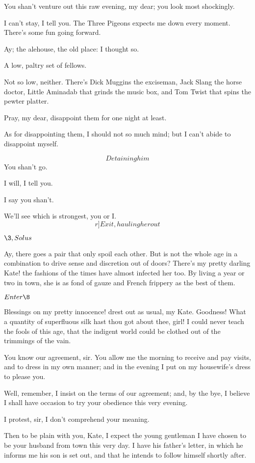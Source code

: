 \documentclass{book}
\begin{document}
\7  You shan't venture out this raw evening, my dear; you
look most shockingly.

\5  I can't stay, I tell you.  The Three Pigeons expects me down
every moment.  There's some fun going forward.

\3  Ay; the alehouse, the old place: I thought so.


\7  A low, paltry set of fellows.

\5  Not so low, neither.  There's Dick Muggins the exciseman, Jack
Slang the horse doctor, Little Aminadab that grinds the music box, and
Tom Twist that spins the pewter platter.

\7  Pray, my dear, disappoint them for one night at
least.

\5  As for disappointing them, I should not so much mind; but I
can't abide to disappoint myself.

\7  \[Detaining him\]  You shan't go.

\5  I will, I tell you.

\7  I say you shan't.

\5  We'll see which is strongest, you or I.  \[r]Exit, hauling her
out\]

\(\3, Solus\)

\3 Ay, there goes a pair that only spoil each
other.  But is not the whole age in a combination to drive sense and
discretion out of doors?  There's my pretty darling Kate! the fashions
of the times have almost infected her too.  By living a year or two in
town, she is as fond of gauze and French frippery as the best of them.


\(Enter \8\)


\3  Blessings on my pretty innocence! drest out as usual, my
Kate.  Goodness!  What a quantity of superfluous silk hast thou got
about thee, girl!  I could never teach the fools of this age, that the
indigent world could be clothed out of the trimmings of the vain.

\8  You know our agreement, sir.  You allow me the
morning to receive and pay visits, and to dress in my own manner; and
in the evening I put on my housewife's dress to please you.

\3  Well, remember, I insist on the terms of our agreement;
and, by the bye, I believe I shall have occasion to try your obedience
this very evening.

\8  I protest, sir, I don't comprehend your meaning.

\3  Then to be plain with you, Kate, I expect the young
gentleman I have chosen to be your husband from town this very day.  I
have his father's letter, in which he informs me his son is set out,
and that he intends to follow himself shortly after.
\end{document}
